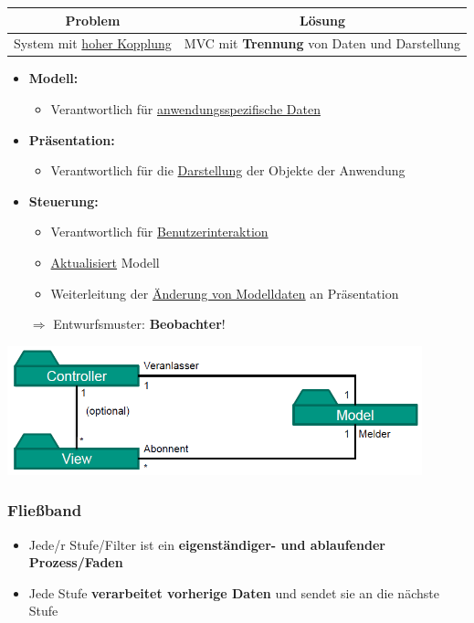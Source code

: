 \begin{center}
\begin{tabular}{c|c}
\textbf{Problem} & \textbf{Lösung} \\
\hline
System mit \underline{hoher Kopplung} & MVC mit \textbf{Trennung} von Daten und Darstellung
\end{tabular}
\end{center}
			
\begin{itemize}
\item \textbf{Modell:}
\begin{itemize}
\item Verantwortlich für \underline{anwendungsspezifische Daten}
\end{itemize}
\item \textbf{Präsentation:}
\begin{itemize}
\item Verantwortlich für die \underline{Darstellung} der Objekte der Anwendung
\end{itemize}
\item \textbf{Steuerung:}
\begin{itemize}
\item Verantwortlich für \underline{Benutzerinteraktion}
\item \underline{Aktualisiert} Modell
\item Weiterleitung der \underline{Änderung von Modelldaten} an Präsentation
\end{itemize}
$\Rightarrow$ Entwurfsmuster: \textbf{Beobachter}!
\end{itemize}
	
\begin{center}
\includegraphics[width=0.9\textwidth]{../images/mvc.png}
\end{center}
	
\subsubsection{Fließband}
			
\begin{itemize}
\item Jede/r Stufe/Filter ist ein \textbf{eigenständiger- und ablaufender Prozess/Faden}
\item Jede Stufe \textbf{verarbeitet vorherige Daten} und sendet sie an die nächste Stufe
\end{itemize}
	
